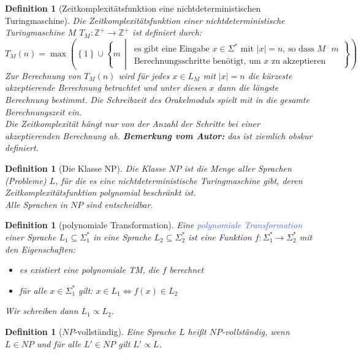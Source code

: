 \documentclass[11pt]{scrartcl}
\newcommand{\tcol}[1]{\textcolor{RoyalBlue}{#1}}
\newcommand{\set}[1]{\left\lbrace #1\right\rbrace}
\theoremstyle{break}
\newtheorem{defi}[satz]{Definition}
\begin{document}
    \begin{defi}[Zeitkomplexitätsfunktion eine nichtdeterministischen Turingmaschine]
        Die Zeitkomplexitätsfunktion einer nichtdeterministische Turingmaschine $M$ $T_M\colon\mathbb{Z}^+\to\mathbb{Z}^+$ ist definiert durch:
        \[
            T_M(n)=\max\left(\set{1}\cup\set{m\,\middle|\,
            \begin{array}{c}
                \text{es gibt eine Eingabe $x\in\Sigma^*$ mit $|x|=n$, so dass $M$ $m$}\\
                \text{Berechnungsschritte benötigt, um $x$ zu akzeptieren}
            \end{array}}\right)
        \]
        Zur Berechnung von $T_M(n)$ wird für jedes $x\in L_M$ mit $|x|=n$ die kürzeste akzeptierende Berechnung betrachtet und unter diesen $x$ dann die längste Berechnung bestimmt.
        Die Schreibzeit des Orakelmoduls spielt mit in die gesamte Berechnungszeit ein.\\
        Die Zeitkomplexität hängt nur von der Anzahl der Schritte bei einer akzeptierenden Berechnung ab.
        \textbf{Bemerkung vom Autor:} das ist ziemlich obskur definiert.
    \end{defi}

    \begin{defi}[Die Klasse NP]
        Die Klasse $NP$ ist die Menge aller Sprachen (Probleme) $L$, für die es eine nichtdeterministische Turingmaschine gibt, deren Zeitkomplexitätsfunktion polynomial beschränkt ist.\\
        Alle Sprachen in $NP$ sind entscheidbar.
    \end{defi}

    \begin{defi}[polynomiale Transformation]
        Eine \tcol{polynomiale Transformation} einer Sprache $L_1\subseteq\Sigma_1^*$ in eine Sprache $L_2\subseteq\Sigma_2^*$ ist eine Funktion $f\colon\Sigma_1^*\to\Sigma_2^*$ mit den Eigenschaften:
        \begin{itemize}
            \item es existiert eine polynomiale TM, die $f$ berechnet
            \item für alle $x\in\Sigma_1^*$ gilt: $x\in L_1\Leftrightarrow f(x)\in L_2$
        \end{itemize}
        Wir schreiben dann $L_1\propto L_2$.
    \end{defi}

    \begin{defi}[$NP$-vollständig]
        Eine Sprache $L$ heißt $NP$-vollständig, wenn $L\in NP$ und für alle $L'\in NP$ gilt $L'\propto L$.
    \end{defi}
\end{document}
